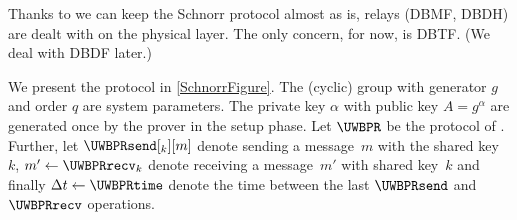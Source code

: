 Thanks to \textcite{UWBPR} we can keep the Schnorr protocol 
almost as is, relays (\ac{DBMF}, \ac{DBDH}) are dealt with on the physical 
layer.
The only concern, for now, is \acl{DBTF}.
(We deal with \acl{DBDF} later.)

We present the protocol in \cref{SchnorrFigure}.
The (cyclic) group with generator \(g\) and order \(q\) are system parameters.
The private key \(\alpha\) with public key \(A = g^\alpha\) are generated once by the prover in the setup phase.
Let \(\UWBPR\) be the protocol of \textcite{UWBPR}.
Further, let
\(\UWBPRsend[_k][m]\) denote sending a message~\(m\) with the shared key~\(k\),
\(m'\gets \UWBPRrecv_k\) denote receiving a message~\(m'\) with shared 
key~\(k\) and finally
\(\Delta t\gets \UWBPRtime\) denote the time between the last \(\UWBPRsend\) 
and \(\UWBPRrecv\) operations.

